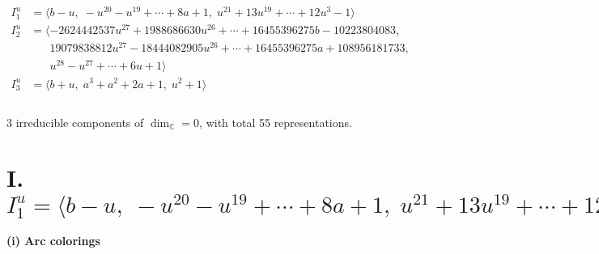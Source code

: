 \documentclass[1p]{elsarticle_modified}
\theoremstyle{definition}
\begin{document}
\begin{align*}
I^u_{1}&=\langle 
b- u,\;- u^{20}- u^{19}+\cdots+8 a+1,\;u^{21}+13 u^{19}+\cdots+12 u^3-1\rangle \\
I^u_{2}&=\langle 
-2624442537 u^{27}+1988686630 u^{26}+\cdots+16455396275 b-10223804083,\\
\phantom{I^u_{2}}&\phantom{= \langle  }19079838812 u^{27}-18444082905 u^{26}+\cdots+16455396275 a+108956181733,\\
\phantom{I^u_{2}}&\phantom{= \langle  }u^{28}- u^{27}+\cdots+6 u+1\rangle \\
I^u_{3}&=\langle 
b+u,\;a^3+a^2+2 a+1,\;u^2+1\rangle \\
\\
\end{align*}
\raggedright * 3 irreducible components of $\dim_{\mathbb{C}}=0$, with total 55 representations.\\
\newpage
\renewcommand{\arraystretch}{1}
\centering \section*{I. $I^u_{1}= \langle b- u,\;- u^{20}- u^{19}+\cdots+8 a+1,\;u^{21}+13 u^{19}+\cdots+12 u^3-1 \rangle$}
\flushleft \textbf{(i) Arc colorings}\\
\end{document}
